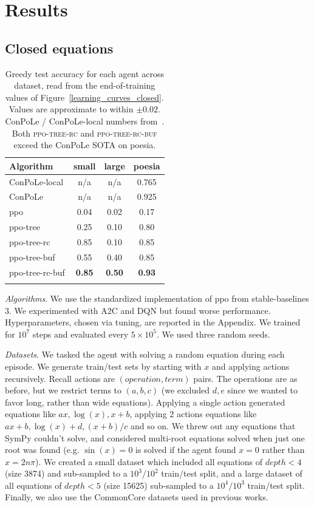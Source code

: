 \documentclass{article}
\theoremstyle{plain}
\theoremstyle{definition}
\theoremstyle{remark}
\begin{document}
\section{Results}
\label{sec:results}

\subsection{Closed equations}
\label{sec:closed}
\begin{table}[t!]
\centering
\footnotesize
\caption{Greedy test accuracy for each agent across dataset, read from the end-of-training values of Figure~\ref{learning_curves_closed}. Values are approximate to within $\pm 0.02$. ConPoLe / ConPoLe-local numbers from~\cite{poesia2021contrastive}. Both \textsc{ppo-tree-rc} and \textsc{ppo-tree-rc-buf} exceed the ConPoLe SOTA on poesia.}
\begin{tabular}{l c c c}
\toprule
Algorithm & small & large & poesia \\
\midrule
ConPoLe-local     & n/a   & n/a   & 0.765 \\
ConPoLe           & n/a   & n/a   & 0.925 \\
\midrule
ppo               & 0.04  & 0.02  & 0.17  \\
ppo-tree          & 0.25  & 0.10  & 0.80  \\
ppo-tree-rc       & 0.85  & 0.10  & 0.85  \\
ppo-tree-buf      & 0.55  & 0.40  & 0.85  \\
ppo-tree-rc-buf   & \textbf{0.85} & \textbf{0.50} & \textbf{0.93} \\
\bottomrule
\label{tab:test_greedy}
\end{tabular}
\end{table}

\textit{Algorithms}. We use the standardized implementation of ppo from stable-baselines 3. We experimented with A2C and DQN but found worse performance. Hyperparameters, chosen via tuning, are reported in the Appendix. We trained for $10^7$ steps and evaluated every $5 \times 10^5$. We used three random seeds. 

\textit{Datasets}. We tasked the agent with solving a random equation during each episode. We generate train/test sets by starting with $x$ and applying actions recursively. Recall actions are $(operation, term)$ pairs. The operations are as before, but we restrict terms to $(a, b, c)$ (we excluded $d, e$ since we wanted to favor long, rather than wide equations). Applying a single action generated equations like $ax, \log(x), x+b$, applying 2 actions equations like $ax+b, \log(x)+d, (x+b)/c$ and so on. We threw out any equations that SymPy couldn't solve, and considered multi-root equations solved when just one root was found (e.g. $\sin(x) = 0$ is solved if the agent found $x=0$ rather than $x = 2 n \pi$). We created a small dataset which included all equations of $depth<4$ (size 3874) and sub-sampled to a $10^3/10^2$ train/test split, and a large dataset of all equations of $depth<5$ (size 15625) sub-sampled to a $10^4/10^3$ train/test split. Finally, we also use the CommonCore datasets used in previous works.
\end{document}
